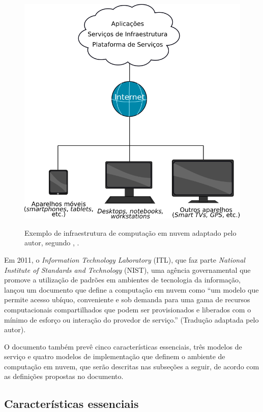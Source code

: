 \documentclass[
	12pt,				%
	openright,			%
	twoside,			%
	a4paper,			%
	english,			%
	french,				%
	spanish,			%
	brazil				%
	]{abntex2}
\begin{document}
\begin{figure}[h]
	\caption{Exemplo de infraestrutura de computação em nuvem adaptado pelo autor, segundo \citeauthor{marston2011cloud}, \citeyear{marston2011cloud}.}
	\includegraphics[scale=0.5]{compnuvem}
	\centering
	\label{fig:compnuvem}
\end{figure}

Em 2011, o \emph{Information Technology Laboratory} (ITL), que faz parte \emph{National Institute of Standards and Technology} (NIST), uma agência governamental que promove a utilização de padrões em ambientes de tecnologia da informação, lançou um documento que define a computação em nuvem como ``um modelo que permite acesso ubíquo, conveniente e sob demanda para uma gama de recursos computacionais compartilhados que podem ser provisionados e liberados com o mínimo de esforço ou interação do provedor de serviço.'' \cite[p. 2]{mell2011nist} (Tradução adaptada pelo autor).

O documento também prevê cinco características essenciais, três modelos de serviço e quatro modelos de implementação que definem o ambiente de computação em nuvem, que serão descritas nas subseções a seguir, de acordo com as definições propostas no documento.

\subsection{Características essenciais}
\end{document}
